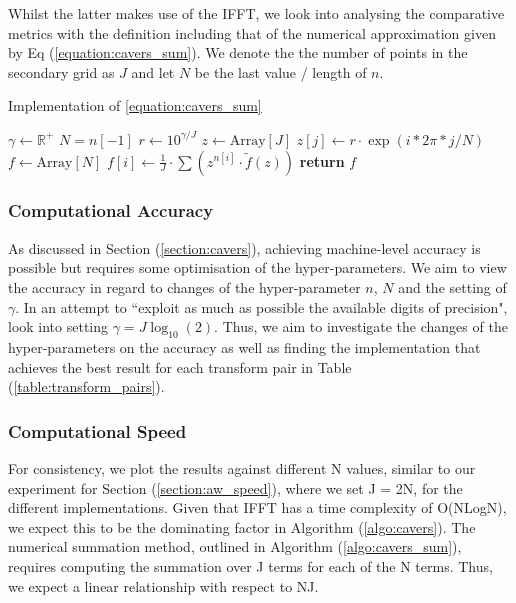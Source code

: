 \documentclass[a4paper]{report}
\begin{document}
Whilst the latter makes use of the IFFT, we look into analysing the comparative metrics with the definition including that of the numerical approximation given by Eq (\ref{equation:cavers_sum}). We denote the the number of points in the secondary grid as $J$ and let $N$ be the last value / length of $n$.

\begin{algorithm}[H]
\caption{Implementation of \autoref{equation:cavers_sum}}
\label{algo:cavers_sum}
\begin{algorithmic}[1]
	\State $\gamma \gets \mathbb{R}^+$
	\State $N = n[-1]$
    \State $r \gets 10^{\gamma / J}$ 
    \State $z \gets \text{Array}[J]$
                \State $z[j] \gets r \cdot \exp{(i * 2\pi * j / N)}$
            \EndFor
    \State $f \gets \text{Array}[N]$
        \State $f[i] \gets \frac{1}{J} \cdot \sum (z^{n[i]} \cdot \tilde{f}(z))$ 
    \EndFor
    \State \textbf{return} $f$
\EndProcedure
\end{algorithmic}
\end{algorithm}

\subsubsection{Computational Accuracy}
As discussed in Section (\ref{section:cavers}), achieving machine-level accuracy is possible but requires some optimisation of the hyper-parameters. We aim to view the accuracy in regard to changes of the hyper-parameter $n$, $N$ and the setting of $\gamma$. In an attempt to ``exploit as much as possible the available digits of precision", \citet{loveless2023phelanguido} look into setting $\gamma = J\log_{10}(2)$. Thus, we aim to investigate the changes of the hyper-parameters on the accuracy as well as finding the implementation that achieves the best result for each transform pair in Table (\ref{table:transform_pairs}).

\subsubsection{Computational Speed}
For consistency, we plot the results against different N values, similar to our experiment for Section (\ref{section:aw_speed}), where we set J = 2N, for the different implementations. Given that IFFT has a time complexity of O(NLogN), we expect this to be the dominating factor in Algorithm (\ref{algo:cavers}). The numerical summation method, outlined in Algorithm (\ref{algo:cavers_sum}), requires computing the summation over J terms for each of the N terms. Thus, we expect a linear relationship with respect to NJ.
\end{document}
